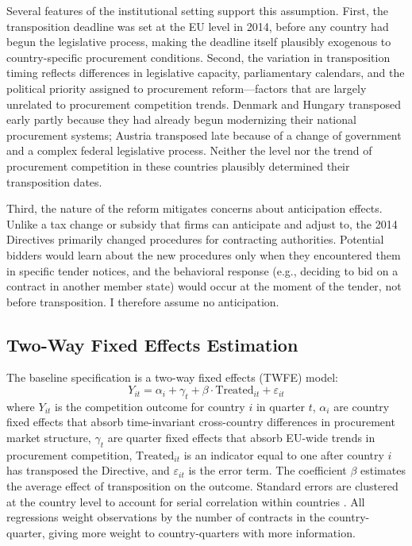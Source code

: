 \documentclass[12pt]{article}
\begin{document}
Several features of the institutional setting support this assumption. First, the transposition deadline was set at the EU level in 2014, before any country had begun the legislative process, making the deadline itself plausibly exogenous to country-specific procurement conditions. Second, the variation in transposition timing reflects differences in legislative capacity, parliamentary calendars, and the political priority assigned to procurement reform---factors that are largely unrelated to procurement competition trends. Denmark and Hungary transposed early partly because they had already begun modernizing their national procurement systems; Austria transposed late because of a change of government and a complex federal legislative process. Neither the level nor the trend of procurement competition in these countries plausibly determined their transposition dates.

Third, the nature of the reform mitigates concerns about anticipation effects. Unlike a tax change or subsidy that firms can anticipate and adjust to, the 2014 Directives primarily changed procedures for contracting authorities. Potential bidders would learn about the new procedures only when they encountered them in specific tender notices, and the behavioral response (e.g., deciding to bid on a contract in another member state) would occur at the moment of the tender, not before transposition. I therefore assume no anticipation.

\subsection{Two-Way Fixed Effects Estimation}

The baseline specification is a two-way fixed effects (TWFE) model:
\begin{equation}
Y_{it} = \alpha_i + \gamma_t + \beta \cdot \text{Treated}_{it} + \varepsilon_{it}
\label{eq:twfe}
\end{equation}
where $Y_{it}$ is the competition outcome for country $i$ in quarter $t$, $\alpha_i$ are country fixed effects that absorb time-invariant cross-country differences in procurement market structure, $\gamma_t$ are quarter fixed effects that absorb EU-wide trends in procurement competition, $\text{Treated}_{it}$ is an indicator equal to one after country $i$ has transposed the Directive, and $\varepsilon_{it}$ is the error term. The coefficient $\beta$ estimates the average effect of transposition on the outcome. Standard errors are clustered at the country level to account for serial correlation within countries \citep{callaway2021difference}. All regressions weight observations by the number of contracts in the country-quarter, giving more weight to country-quarters with more information.
\end{document}
